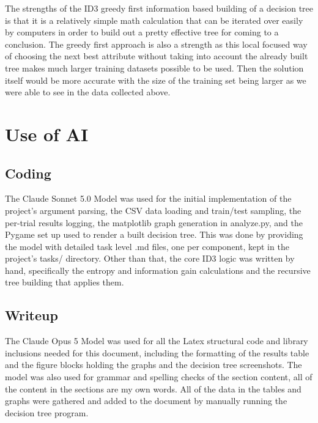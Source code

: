 \documentclass[conference]{IEEEtran}
\begin{document}
    The strengths of the ID3 greedy first information based building of a decision tree is that it is a relatively simple math calculation that can be iterated over easily by computers in order to build out a pretty effective tree for coming to a conclusion. The greedy first approach is also a strength as this local focused way of choosing the next best attribute without taking into account the already built tree makes much larger training datasets possible to be used. Then the solution itself would be more accurate with the size of the training set being larger as we were able to see in the data collected above. 


\section*{Use of AI}

\subsection*{Coding}
    The Claude Sonnet 5.0 Model was used for the initial implementation of the project's argument parsing, the CSV data loading and train/test sampling, the per-trial results logging, the matplotlib graph generation in analyze.py, and the Pygame set up used to render a built decision tree. This was done by providing the model with detailed task level .md files, one per component, kept in the project's tasks/ directory. Other than that, the core ID3 logic was written by hand, specifically the entropy and information gain calculations and the recursive tree building that applies them.

\subsection*{Writeup}
    The Claude Opus 5 Model was used for all the Latex structural code and library inclusions needed for this document, including the formatting of the results table and the figure blocks holding the graphs and the decision tree screenshots. The model was also used for grammar and spelling checks of the section content, all of the content in the sections are my own words. All of the data in the tables and graphs were gathered and added to the document by manually running the decision tree program.
\end{document}
